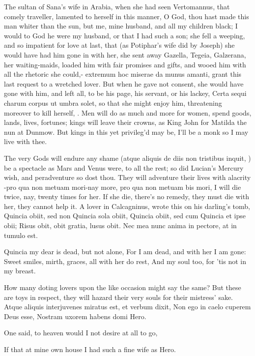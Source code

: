 {The sultan of Sana's wife in Arabia, when she had seen Vertomannus,
that comely traveller, lamented to herself in this manner, O God,
thou hast made this man whiter than the sun, but me, mine husband, and
all my children black; I would to God he were my husband, or that I had
such a son; she fell a weeping, and so impatient for love at last, that
(as Potiphar's wife did by Joseph) she would have had him gone in with
her, she sent away Gazella, Tegeia, Galzerana, her waiting-maids,
loaded him with fair promises and gifts, and wooed him with all the
rhetoric she could,- extremum hoc miserae da munus amanti, grant this
last request to a wretched lover. But when he gave not consent, she
would have gone with him, and left all, to be his page, his servant, or
his lackey, Certa sequi charum corpus ut umbra solet, so that she might
enjoy him, threatening moreover to kill herself, \etc{}. Men will do as
much and more for women, spend goods, lands, lives, fortunes; kings
will leave their crowns, as King John for Matilda the nun at Dunmow.
But kings in this yet privileg'd may be,
I'll be a monk so I may live with thee.

The very Gods will endure any shame (atque aliquis de diis non
tristibus inquit, \etc{}) be a spectacle as Mars and Venus were, to all
the rest; so did Lucian's Mercury wish, and peradventure so dost thou.
They will adventure their lives with alacrity -pro qua non metuam
mori-nay more, pro qua non metuam bis mori, I will die twice, nay,
twenty times for her. If she die, there's no remedy, they must die with
her, they cannot help it. A lover in Calcagninus, wrote this on his
darling's tomb,
Quincia obiit, sed non Quincia sola obiit,
Quincia obiit, sed cum Quincia et ipse obii;
Risus obit, obit gratia, lusus obit.
Nec mea nunc anima in pectore, at in tumulo est.

Quincia my dear is dead, but not alone,
For I am dead, and with her I am gone:
Sweet smiles, mirth, graces, all with her do rest,
And my soul too, for 'tis not in my breast.

How many doting lovers upon the like occasion might say the same? But
these are toys in respect, they will hazard their very souls for their
mistress' sake.
Atque aliquis interjuvenes miratus est, et verbum dixit,
Non ego in caelo cuperem Deus esse,
Nostram uxorem habens domi Hero.


One said, to heaven would I not
desire at all to go,

If that at mine own house I had
such a fine wife as Hero.

}
